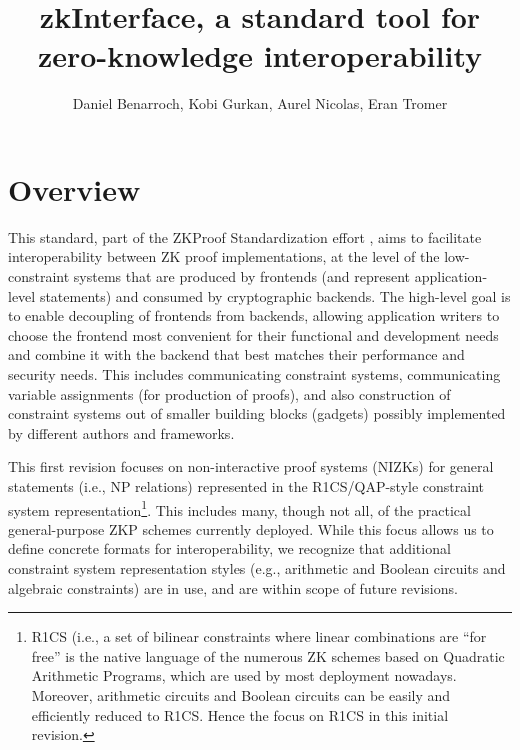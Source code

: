 \documentclass[a4paper,12pt]{article}
\title{zkInterface, a standard tool for zero-knowledge interoperability}
\author{Daniel Benarroch, Kobi Gurkan, Aurel Nicolas, Eran Tromer}
\newcommand{\enote}[1]{\dtcolornote[Eran]{darkgreen}{#1}}
\begin{document}
		
		\maketitle
		 
\tableofcontents
\section{Overview}
This standard, part of the ZKProof Standardization effort \cite{ZKProofSecurity, ZKProofImplementation, ZKProofApplications}, aims to facilitate interoperability between ZK proof implementations, at the level of the low-constraint systems that are produced by frontends (and represent application-level statements) and consumed by cryptographic backends. The high-level goal is to enable decoupling of frontends from backends, allowing application writers to choose the frontend most convenient for their functional and development needs and combine it with the backend that best matches their performance and security needs. This includes communicating constraint systems, communicating variable assignments (for production of proofs), and also construction of constraint systems out of smaller building blocks (gadgets) possibly implemented by different authors and frameworks.

This first revision focuses on non-interactive proof systems (NIZKs) for general statements (i.e., NP relations) represented in the R1CS/QAP-style constraint system representation\footnote{R1CS (i.e., a set of bilinear constraints where linear combinations are ``for free'' is the native language of the numerous ZK schemes based on Quadratic Arithmetic Programs, which are used by most deployment nowadays. Moreover, arithmetic circuits and Boolean circuits can be easily and efficiently reduced to R1CS. Hence the focus on R1CS in this initial revision.}. This includes many, though not all, of the practical general-purpose ZKP schemes currently deployed. While this focus allows us to define concrete formats for interoperability, we recognize that additional constraint system representation styles (e.g., arithmetic and Boolean circuits and algebraic constraints) are in use, and are within scope of future revisions.
\end{document}
